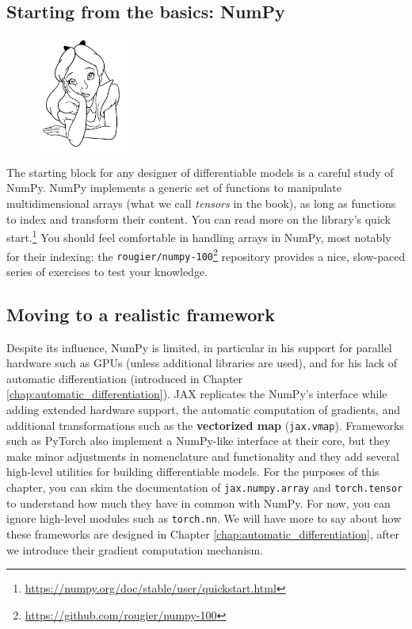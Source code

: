 \subsection*{Starting from the basics: NumPy}

\begin{figure}
\vspace{-4em}\includegraphics[width=3.0cm]{images/shutterstock_2075221579.jpg}
\vspace{-2em}
\end{figure} 

The starting block for any designer of differentiable models is a careful study of NumPy. NumPy implements a generic set of functions to manipulate multidimensional arrays (what we call \textit{tensors} in the book), as long as functions to index and transform their content. You can read more on the library's quick start.\footnote{\url{https://numpy.org/doc/stable/user/quickstart.html}} You should feel comfortable in handling arrays in NumPy, most notably for their indexing: the {\footnotesize\verb+rougier/numpy-100+}\footnote{\url{https://github.com/rougier/numpy-100}} repository provides a nice, slow-paced series of exercises to test your knowledge.

\subsection*{Moving to a realistic framework}

Despite its influence, NumPy is limited, in particular in his support for parallel hardware such as GPUs (unless additional libraries are used), and for his lack of automatic differentiation (introduced in Chapter \ref{chap:automatic_differentiation}). JAX replicates the NumPy's interface while adding extended hardware support, the automatic computation of gradients, and additional transformations such as the \textbf{vectorized map} (\texttt{jax.vmap}). Frameworks such as PyTorch also implement a NumPy-like interface at their core, but they make minor adjustments in nomenclature and functionality and they add several high-level utilities for building differentiable models. For the purposes of this chapter, you can skim the documentation of \texttt{jax.numpy.array} and \texttt{torch.tensor} to understand how much they have in common with NumPy. For now, you can ignore high-level modules such as \texttt{torch.nn}. We will have more to say about how these frameworks are designed in Chapter \ref{chap:automatic_differentiation}, after we introduce their gradient computation mechanism.

